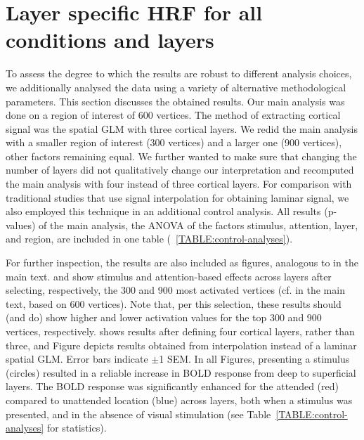 \documentclass[9pt,lineno]{aperture}
\begin{document}
\appendix
\begin{appendixbox}
\label{first:app}
\section{Layer specific HRF for all conditions and layers}
To assess the degree to which the results are robust to different analysis choices, we additionally analysed the data using a variety of alternative methodological parameters. This section discusses the obtained results. Our main analysis was done on a region of interest of 600 vertices. The method of extracting cortical signal was the spatial GLM \citep{VanMourik2019} with three cortical layers. We redid the main analysis with a smaller region of interest (300 vertices) and a larger one (900 vertices), other factors remaining equal. We further wanted to make sure that changing the number of layers did not qualitatively change our interpretation and recomputed the main analysis with four instead of three cortical layers. For comparison with traditional studies that use signal interpolation for obtaining laminar signal, we also employed this technique in an additional control analysis. All results (p-values) of the main analysis, the ANOVA of the factors stimulus, attention, layer, and region, are included in one table (~\ref{TABLE:control-analyses}).

For further inspection, the results are also included as figures, analogous to  in the main text.  and  show stimulus and attention-based effects across layers after selecting, respectively, the 300 and 900 most activated vertices (cf.  in the main text, based on 600 vertices). Note that, per this selection, these results should (and do) show higher and lower activation values for the top 300 and 900 vertices, respectively. 
 shows results after defining four cortical layers, rather than three, and Figure  depicts results obtained from interpolation instead of a laminar spatial GLM. Error bars indicate $\pm$1 SEM. 
In all Figures, presenting a stimulus (circles) resulted in a reliable increase in BOLD response from deep to superficial layers. The BOLD response was significantly enhanced for the attended (red) compared to unattended location (blue) across layers, both when a stimulus was presented, and in the absence of visual stimulation (see Table~\ref{TABLE:control-analyses} for statistics). 


\end{appendixbox}
\end{document}
